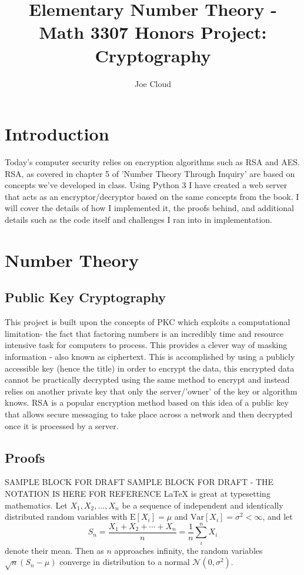 \documentclass[a4paper]{article}
\title{Elementary Number Theory - Math 3307 Honors Project: \\ Cryptography}
\author{Joe Cloud}
\begin{document}
\maketitle


\section{Introduction}

Today's computer security relies on encryption algorithms such as RSA and AES. RSA, as covered in chapter 5 of 'Number Theory Through Inquiry' are based on concepts we've developed in class. Using Python 3 I have created a web server that acts as an encryptor/decryptor based on the same concepts from the book. I will cover the details of how I implemented it, the proofs behind, and additional details such as the code itself and challenges I ran into in implementation.

\section{Number Theory}

\subsection{Public Key Cryptography}
This project is built upon the concepts of PKC which exploits a computational limitation- the fact that factoring numbers is an incredibly time and resource intensive task for computers to process. This provides a clever way of masking information - also known as ciphertext. This is accomplished by using a publicly accessible key (hence the title) in order to encrypt the data, this encrypted data cannot be practically decrypted using the same method to encrypt and instead relies on another private key that only the server/'owner' of the key or algorithm knows. RSA is a popular encryption method based on this idea of a public key that allows secure messaging to take place across a network and then decrypted once it is processed by a server.

\subsection{Proofs}

SAMPLE BLOCK FOR DRAFT SAMPLE BLOCK FOR DRAFT - THE NOTATION IS HERE FOR REFERENCE \newline \newline
\LaTeX{} is great at typesetting mathematics. Let $X_1, X_2, \ldots, X_n$ be a sequence of independent and identically distributed random variables with $\text{E}[X_i] = \mu$ and $\text{Var}[X_i] = \sigma^2 < \infty$, and let
\[S_n = \frac{X_1 + X_2 + \cdots + X_n}{n}
      = \frac{1}{n}\sum_{i}^{n} X_i\]
denote their mean. Then as $n$ approaches infinity, the random variables $\sqrt{n}(S_n - \mu)$ converge in distribution to a normal $\mathcal{N}(0, \sigma^2)$.
\end{document}
